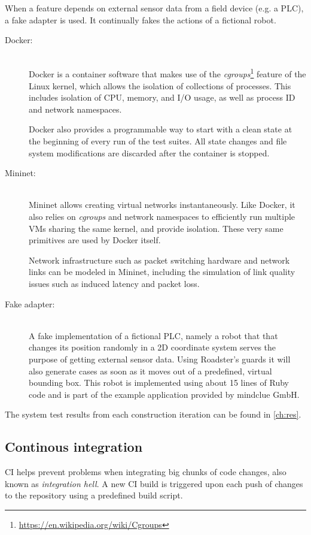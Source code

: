 When a feature depends on external sensor data from a field device (e.g. a \gls{PLC}),
a fake adapter is used. It continually fakes the actions of a fictional robot.

\begin{description}
	\item [Docker:]\hfill\\
		Docker is a container software that makes use of the
		\emph{cgroups}\footnote{\url{https://en.wikipedia.org/wiki/Cgroups}}
		feature of the Linux kernel, which allows the isolation of
		collections of processes. This includes isolation of CPU,
		memory, and I/O usage, as well as process ID and network
		namespaces.

		Docker also provides a programmable way to start with a clean
		state at the beginning of every run of the test suites. All
		state changes and file system modifications are discarded after
		the container is stopped.

	\item [Mininet:]\hfill\\
		Mininet allows creating virtual networks instantaneously.
		Like Docker, it also relies on \emph{cgroups}
		and network namespaces to efficiently run multiple \glspl{VM}
		sharing the same kernel, and provide isolation. These very same
		primitives are used by Docker itself.

		Network infrastructure such as packet switching hardware and
		network links can be modeled in Mininet, including the
		simulation of link quality issues such as induced latency and
		packet loss.

	\item [Fake adapter:]\hfill\\
		A fake implementation of a fictional \gls{PLC}, namely a robot
		that that changes its position randomly in a 2D coordinate
		system serves the purpose of getting external sensor data.
		Using Roadster's guards it will also generate cases as soon as
		it moves out of a predefined, virtual bounding box. This robot
		is implemented using about 15 lines of Ruby code and is part of
		the example application provided by mindclue GmbH.
\end{description}

The system test results from each construction iteration can be found in \autoref{ch:res}.


\subsection{Continous integration}
\Gls{CI} helps prevent problems when integrating big chunks of code changes,
also known as \emph{integration hell}. A new CI build is triggered upon each
push of changes to the repository using a predefined build script.


